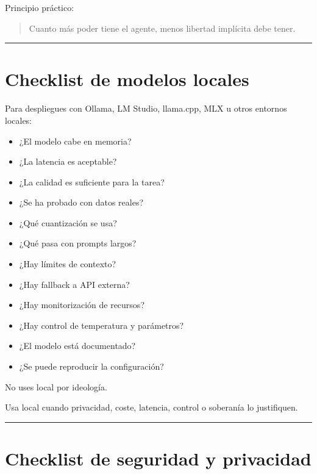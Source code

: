 Principio práctico:

\begin{quote}
Cuanto más poder tiene el agente, menos libertad implícita debe tener.
\end{quote}

\begin{center}\rule{0.5\linewidth}{0.5pt}\end{center}

\section{Checklist de modelos
locales}\label{checklist-de-modelos-locales}

Para despliegues con Ollama, LM Studio, llama.cpp, MLX u otros entornos
locales:

\begin{itemize}
\tightlist
\item
  ¿El modelo cabe en memoria?
\item
  ¿La latencia es aceptable?
\item
  ¿La calidad es suficiente para la tarea?
\item
  ¿Se ha probado con datos reales?
\item
  ¿Qué cuantización se usa?
\item
  ¿Qué pasa con prompts largos?
\item
  ¿Hay límites de contexto?
\item
  ¿Hay fallback a API externa?
\item
  ¿Hay monitorización de recursos?
\item
  ¿Hay control de temperatura y parámetros?
\item
  ¿El modelo está documentado?
\item
  ¿Se puede reproducir la configuración?
\end{itemize}

No uses local por ideología.

Usa local cuando privacidad, coste, latencia, control o soberanía lo
justifiquen.

\begin{center}\rule{0.5\linewidth}{0.5pt}\end{center}

\section{Checklist de seguridad y
privacidad}\label{checklist-de-seguridad-y-privacidad}

